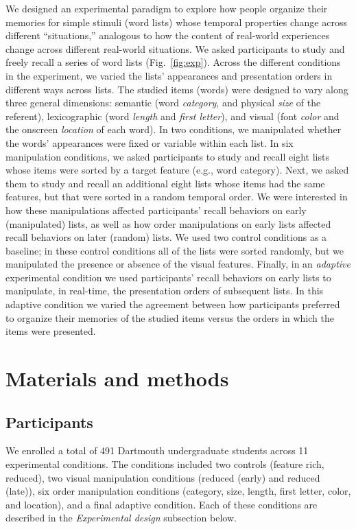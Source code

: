 \documentclass[11pt]{article}
\begin{document}
We designed an experimental paradigm to explore how people organize their
memories for simple stimuli (word lists) whose temporal properties change
across different ``situations,'' analogous to how the content of real-world
experiences change across different real-world situations. We asked
participants to study and freely recall a series of word lists
(Fig.~\ref{fig:exp}). Across the different conditions in the experiment, we
varied the lists' appearances and presentation orders in different ways across
lists. The studied items (words) were designed to vary along three general
dimensions: semantic (word \textit{category}, and physical \textit{size} of the
referent), lexicographic (word \textit{length} and \textit{first letter}), and
visual (font \textit{color} and the onscreen \textit{location} of each word).
In two conditions, we manipulated whether the words' appearances were fixed or
variable within each list. In six manipulation conditions, we asked
participants to study and recall eight lists whose items were sorted by a
target feature (e.g., word category). Next, we asked them to study and recall
an additional eight lists whose items had the same features, but that were
sorted in a random temporal order. We were interested in how these 
manipulations affected participants' recall behaviors on early (manipulated) lists,
as well as how order manipulations on early lists affected recall behaviors on
later (random) lists. We used two control conditions as a baseline;
in these control conditions all of the lists were sorted randomly, but we
manipulated the presence or absence of the visual features. Finally, in an
\textit{adaptive} experimental condition we used participants' recall behaviors
on early lists to manipulate, in real-time, the presentation orders of
subsequent lists. In this adaptive condition we varied the agreement between
how participants preferred to organize their memories of the studied items
versus the orders in which the items were presented.

\section*{Materials and methods}

\subsection*{Participants}

We enrolled a total of 491 Dartmouth undergraduate students across 11
experimental conditions. The conditions included two controls (feature rich,
reduced), two visual manipulation conditions (reduced (early) and reduced
(late)), six order manipulation conditions (category, size, length, first
letter, color, and location), and a final adaptive condition. Each of these
conditions are described in the \textit{Experimental design} subsection below.
\end{document}
